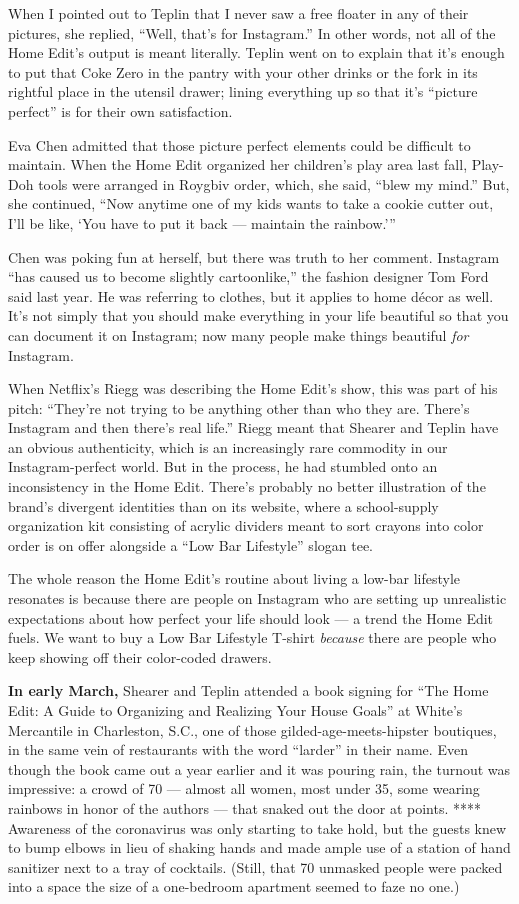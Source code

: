 When I pointed out to Teplin that I never saw a free floater in any of
their pictures, she replied, ``Well, that's for Instagram.'' In other
words, not all of the Home Edit's output is meant literally. Teplin went
on to explain that it's enough to put that Coke Zero in the pantry with
your other drinks or the fork in its rightful place in the utensil
drawer; lining everything up so that it's ``picture perfect'' is for
their own satisfaction.

Eva Chen admitted that those picture perfect elements could be difficult
to maintain. When the Home Edit organized her children's play area last
fall, Play-Doh tools were arranged in Roygbiv order, which, she said,
``blew my mind.'' But, she continued, ``Now anytime one of my kids wants
to take a cookie cutter out, I'll be like, `You have to put it back ---
maintain the rainbow.'''

Chen was poking fun at herself, but there was truth to her comment.
Instagram ``has caused us to become slightly cartoonlike,'' the fashion
designer Tom Ford said last year. He was referring to clothes, but it
applies to home décor as well. It's not simply that you should make
everything in your life beautiful so that you can document it on
Instagram; now many people make things beautiful \emph{for} Instagram.

When Netflix's Riegg was describing the Home Edit's show, this was part
of his pitch: ``They're not trying to be anything other than who they
are. There's Instagram and then there's real life.'' Riegg meant that
Shearer and Teplin have an obvious authenticity, which is an
increasingly rare commodity in our Instagram-perfect world. But in the
process, he had stumbled onto an inconsistency in the Home Edit. There's
probably no better illustration of the brand's divergent identities than
on its website, where a school-supply organization kit consisting of
acrylic dividers meant to sort crayons into color order is on offer
alongside a ``Low Bar Lifestyle'' slogan tee.

The whole reason the Home Edit's routine about living a low-bar
lifestyle resonates is because there are people on Instagram who are
setting up unrealistic expectations about how perfect your life should
look --- a trend the Home Edit fuels. We want to buy a Low Bar Lifestyle
T-shirt \emph{because} there are people who keep showing off their
color-coded drawers.

\textbf{In early March,} Shearer and Teplin attended a book signing for
``The Home Edit: A Guide to Organizing and Realizing Your House Goals''
at White's Mercantile in Charleston, S.C., one of those
gilded-age-meets-hipster boutiques, in the same vein of restaurants with
the word ``larder'' in their name. Even though the book came out a year
earlier and it was pouring rain, the turnout was impressive: a crowd of
70 --- almost all women, most under 35, some wearing rainbows in honor
of the authors --- that snaked out the door at points. **** Awareness of
the coronavirus was only starting to take hold, but the guests knew to
bump elbows in lieu of shaking hands and made ample use of a station of
hand sanitizer next to a tray of cocktails. (Still, that 70 unmasked
people were packed into a space the size of a one-bedroom apartment
seemed to faze no one.)

